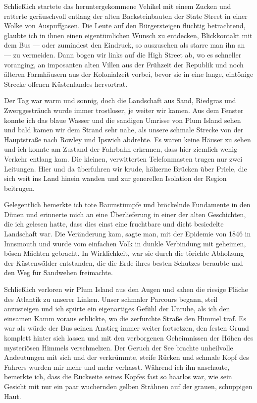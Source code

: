 Schließlich startete das heruntergekommene Vehikel mit einem Zucken und ratterte geräuschvoll entlang der alten Backsteinbauten der State Street in einer Wolke von Auspuffgasen. Die Leute auf den Bürgersteigen flüchtig betrachtend, glaubte ich in ihnen einen eigentümlichen Wunsch zu entdecken, Blickkontakt mit dem Bus --- oder zumindest den Eindruck, so auszusehen als starre man ihn an --- zu vermeiden. Dann bogen wir links auf die High Street ab, wo es schneller voranging, an imposanten alten Villen aus der Frühzeit der Republik und noch älteren Farmhäusern aus der Kolonialzeit vorbei, bevor sie in eine lange, eintönige Strecke offenen Küstenlandes hervortrat.

Der Tag war warm und sonnig, doch die Landschaft aus Sand, Riedgras und Zwerggesträuch wurde immer trostloser, je weiter wir kamen. Aus dem Fenster konnte ich das blaue Wasser und die sandigen Umrisse von Plum Island sehen und bald kamen wir dem Strand sehr nahe, als unsere schmale Strecke von der Hauptstraße nach Rowley und Ipswich abdrehte. Es waren keine Häuser zu sehen und ich konnte am Zustand der Fahrbahn erkennen, dass hier ziemlich wenig Verkehr entlang kam. Die kleinen, verwitterten Telefonmasten trugen nur zwei Leitungen. Hier und da überfuhren wir krude, hölzerne Brücken über Priele, die sich weit ins Land hinein wanden und zur generellen Isolation der Region beitrugen.

Gelegentlich bemerkte ich tote Baumstümpfe und bröckelnde Fundamente in den Dünen und erinnerte mich an eine Überlieferung in einer der alten Geschichten, die ich gelesen hatte, dass dies einst eine fruchtbare und dicht besiedelte Landschaft war. Die Veränderung kam, sagte man, mit der Epidemie von 1846 in Innsmouth und wurde vom einfachen Volk in dunkle Verbindung mit geheimen, bösen Mächten gebracht. In Wirklichkeit, war sie durch die törichte Abholzung der Küstenwälder entstanden, die die Erde ihres besten Schutzes beraubte und den Weg für Sandwehen freimachte.

Schließlich verloren wir Plum Island aus den Augen und sahen die riesige Fläche des Atlantik zu unserer Linken. Unser schmaler Parcours begann, steil anzusteigen und ich spürte ein eigenartiges Gefühl der Unruhe, als ich den einsamen Kamm voraus erblickte, wo die zerfurchte Straße den Himmel traf. Es war als würde der Bus seinen Anstieg immer weiter fortsetzen, den festen Grund komplett hinter sich lassen und mit den verborgenen Geheimnissen der Höhen des mysteriösen Himmels verschmelzen. Der Geruch der See brachte unheilvolle Andeutungen mit sich und der verkrümmte, steife Rücken und schmale Kopf des Fahrers wurden mir mehr und mehr verhasst. Während ich ihn anschaute, bemerkte ich, dass die Rückseite seines Kopfes fast so haarlos war, wie sein Gesicht mit nur ein paar wuchernden gelben Strähnen auf der grauen, schuppigen Haut.

